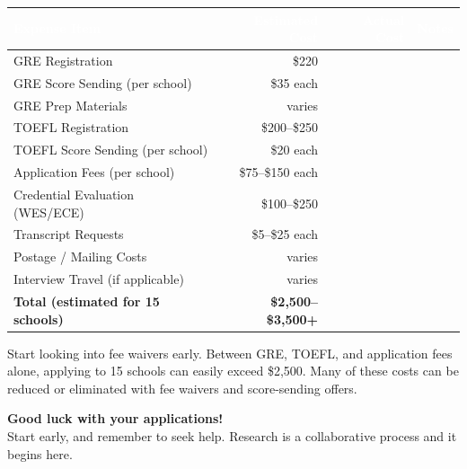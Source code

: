\documentclass[11pt, letterpaper]{article}
\begin{document}
\vspace{6pt}
\begin{center}
\small
\renewcommand{\arraystretch}{1.5}
\begin{tabular}{>{\raggedright\arraybackslash}p{4.5cm} r r >{\raggedright\arraybackslash}p{3.5cm}}
\toprule
\rowcolor{ctabhead} \textcolor{white}{\textbf{Expense Item}} & \textcolor{white}{\textbf{Estimated Cost}} & \textcolor{white}{\textbf{Actual Cost}} & \textcolor{white}{\textbf{Notes}} \\
\midrule
\rowcolor{gray!8} GRE Registration & \$220 & & \\
GRE Score Sending (per school) & \$35 each & & \\
\rowcolor{gray!8} GRE Prep Materials & varies & & \\
TOEFL Registration & \$200--\$250 & & \\
\rowcolor{gray!8} TOEFL Score Sending (per school) & \$20 each & & \\
Application Fees (per school) & \$75--\$150 each & & \\
\rowcolor{gray!8} Credential Evaluation (WES/ECE) & \$100--\$250 & & \\
Transcript Requests & \$5--\$25 each & & \\
\rowcolor{gray!8} Postage / Mailing Costs & varies & & \\
Interview Travel (if applicable) & varies & & \\
\midrule
\rowcolor{clight} \textbf{Total (estimated for 15 schools)} & \textbf{\$2,500--\$3,500+} & & \\
\bottomrule
\end{tabular}
\end{center}
\vspace{6pt}

\begin{tipbox}
Start looking into fee waivers early. Between GRE, TOEFL, and application fees alone, applying to 15 schools can easily exceed \$2,500. Many of these costs can be reduced or eliminated with fee waivers and score-sending offers.
\end{tipbox}

\vspace{20pt}

\begin{center}
\colorbox{cmedium}{%
\begin{minipage}[c]{0.85\textwidth}
\vspace{10pt}
\centering
{\large\bfseries\color{cdark} Good luck with your applications!}\\[6pt]
{\normalsize Start early, and remember to seek help. Research is a collaborative process and it begins here. }
\vspace{10pt}
\end{minipage}%
}
\end{center}
\end{document}
